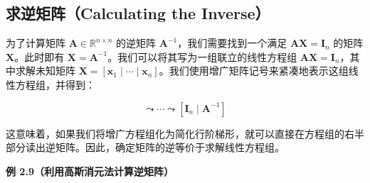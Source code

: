\subsection*{求逆矩阵（Calculating the Inverse）}

为了计算矩阵 $ \boldsymbol{A} \in \mathbb{R}^{n \times n} $ 的逆矩阵 $ \boldsymbol{A}^{-1} $，我们需要找到一个满足 $ \boldsymbol{A} \boldsymbol{X} = \boldsymbol{I}_n $ 的矩阵 $ \boldsymbol{X} $。此时即有 $ \boldsymbol{X} = \boldsymbol{A}^{-1} $。我们可以将其写为一组联立的线性方程组 $ \boldsymbol{A} \boldsymbol{X} = \boldsymbol{I}_n $，其中求解未知矩阵 $ \boldsymbol{X} = [\boldsymbol{x}_1 \mid \cdots \mid \boldsymbol{x}_n] $。我们使用增广矩阵记号来紧凑地表示这组线性方程组，并得到：

\begin{equation}
[\boldsymbol{A} \mid \boldsymbol{I}_n] \leadsto \cdots \leadsto [\boldsymbol{I}_n \mid \boldsymbol{A}^{-1}]
\tag{2.56}\label{eq:2-56}
\end{equation}

这意味着，如果我们将增广方程组化为简化行阶梯形，就可以直接在方程组的右半部分读出逆矩阵。因此，确定矩阵的逆等价于求解线性方程组。

\begin{notebox}
\textbf{例 2.9（利用高斯消元法计算逆矩阵）}
\end{notebox}

